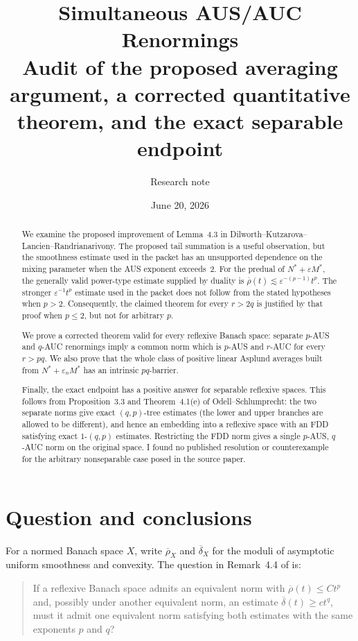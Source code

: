 \documentclass[11pt]{article}
\title{Simultaneous AUS/AUC Renormings\\
\large Audit of the proposed averaging argument, a corrected quantitative theorem, and the exact separable endpoint}
\author{Research note}
\date{June 20, 2026}
\theoremstyle{definition}
\theoremstyle{remark}
\newcommand{\rhobar}{\overline\rho}
\newcommand{\deltabar}{\overline\delta}
\newcommand{\eps}{\varepsilon}
\begin{document}
\maketitle

\begin{abstract}
We examine the proposed improvement of Lemma~4.3 in
Dilworth--Kutzarova--Lancien--Randrianarivony.  The proposed tail summation is a
useful observation, but the smoothness estimate used in the packet has an
unsupported dependence on the mixing parameter when the AUS exponent
exceeds~2.
For the predual of
\(N^*+\eps M^*\), the generally valid power-type estimate supplied by duality is
\(\rhobar(t)\lesssim \eps^{-(p-1)}t^p\).  The stronger
\(\eps^{-1}t^p\) estimate used in the packet does not follow from the
stated hypotheses when \(p>2\).  Consequently, the claimed theorem for every
\(r>2q\) is justified by that proof when \(p\le 2\), but not for arbitrary
\(p\).

We prove a corrected theorem valid for every reflexive Banach space: separate
\(p\)-AUS and \(q\)-AUC renormings imply a common norm which is
\(p\)-AUS and \(r\)-AUC for every \(r>pq\).  We also prove that the whole class
of positive linear Asplund averages built from
\(N^*+\eps_nM^*\) has an intrinsic \(pq\)-barrier.

Finally, the exact endpoint has a positive answer for separable reflexive
spaces.  This follows from Proposition~3.3 and Theorem~4.1(e) of
Odell--Schlumprecht: the two separate norms give exact
\((q,p)\)-tree estimates (the lower and upper branches are allowed to be
different), and hence an embedding into a reflexive space with an FDD
satisfying exact \(1\)-\((q,p)\) estimates.  Restricting the FDD norm gives a
single \(p\)-AUS, \(q\)-AUC norm on the original space.  I found no published
resolution or counterexample for the arbitrary nonseparable case posed in the
source paper.
\end{abstract}

\section{Question and conclusions}

For a normed Banach space \(X\), write \(\rhobar_X\) and \(\deltabar_X\) for
the moduli of asymptotic uniform smoothness and convexity.  The question in
Remark~4.4 of \cite{DKLR} is:

\begin{quote}
If a reflexive Banach space admits an equivalent norm with
\(\rhobar(t)\le C t^p\) and, possibly under another equivalent norm, an
estimate \(\deltabar(t)\ge c t^q\), must it admit one equivalent norm satisfying
both estimates with the same exponents \(p\) and \(q\)?
\end{quote}
\end{document}
